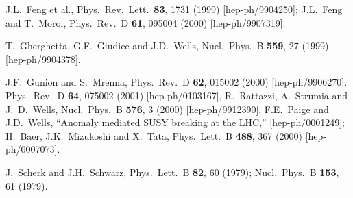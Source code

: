 \documentclass[11pt]{article}
\begin{document}
\begin{thebibliography}{999}
J.L.~Feng et al.,
  Phys.\ Rev.\ Lett.\  {\bf 83}, 1731 (1999)
  [hep-ph/9904250];
J.L.~Feng and T.~Moroi,
  Phys.\ Rev.\ D {\bf 61}, 095004 (2000)
  [hep-ph/9907319].

T.~Gherghetta, G.F.~Giudice and J.D.~Wells,
  Nucl.\ Phys.\ B {\bf 559}, 27 (1999)
  [hep-ph/9904378].

J.F.~Gunion and S.~Mrenna,
  Phys.\ Rev.\ D {\bf 62}, 015002 (2000)
  [hep-ph/9906270].
  Phys.\ Rev.\ D {\bf 64}, 075002 (2001)
  [hep-ph/0103167],
R.~Rattazzi, A.~Strumia and J.~D.~Wells,
  Nucl.\ Phys.\ B {\bf 576}, 3 (2000)
  [hep-ph/9912390].
F.E.~Paige and J.D.~Wells,
  ``Anomaly mediated SUSY breaking at the LHC,''
  [hep-ph/0001249];
H.~Baer, J.K.~Mizukoshi and X.~Tata,
  Phys.\ Lett.\ B {\bf 488}, 367 (2000)
  [hep-ph/0007073].

J.~Scherk and J.H.~Schwarz,
  Phys.\ Lett.\ B {\bf 82}, 60 (1979);
  Nucl.\ Phys.\ B {\bf 153}, 61 (1979).


\end{thebibliography}
\end{document}
